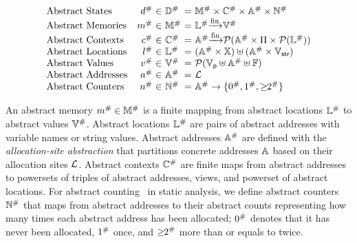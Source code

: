 \[
  \begin{array}{lr@{~}c@{~}l@{~}c@{~}l}
    \text{Abstract States} & \abselem &\in& \absdom &=& \absmemset \times \absctxtset
    \times \absaddrset \times \abscountset\\
    \text{Abstract Memories} & \absmem &\in& \absmemset &=& \abslocset \finmap
    \absvalset\\
    \text{Abstract Contexts} & \absctxt &\in& \absctxtset &=& \absaddrset \finmap
    \powerset{\absaddrset \times \viewset \times \powerset{\abslocset}}\\
    \text{Abstract Locations} & \absloc &\in& \abslocset &=& (\absaddrset \times
    \varset) \uplus (\absaddrset \times \strset)\\
    \text{Abstract Values} & \absval &\in& \absvalset &=& \powerset{\pvalset
    \uplus \absaddrset \uplus \fvalset}\\
    \text{Abstract Addresses} & \absaddr &\in& \absaddrset &=& \labset\\
    \text{Abstract Counters} & \abscount &\in& \abscountset &=& \absaddrset
    \rightarrow \{ \abszero, \absone, \absmany \}\\
  \end{array}
\]

An abstract memory ${m}^{\#} \in {\mathbb{M}}^{\#}$ is a finite mapping from abstract
locations ${\mathbb{L}}^{\#}$ to abstract values ${\mathbb{V}}^{\#}$.  Abstract locations
${\mathbb{L}}^{\#}$ are pairs of abstract addresses with variable names or string
values. Abstract addresses ${\mathbb{A}}^{\#}$ are defined with the
\textit{allocation-site abstraction} that partitions concrete addresses
$\mathbb{A}$ based on their allocation sites $\mathcal{L}$.  Abstract contexts
${\mathbb{C}}^{\#}$ are finite maps from abstract addresses to powersets of triples of
abstract addresses, views, and powerset of abstract locations.  For abstract
counting~\cite{abstract-gc-counting, revisit-recency} in static analysis, we
define abstract counters ${\mathbb{N}}^{\#}$ that maps from abstract addresses to
their abstract counts representing how many times each abstract address has been
allocated; ${0}^{\#}$ denotes that it has never been allocated, ${1}^{\#}$ once,
and ${\geq\!\!2}^{\#}$ more than or equals to twice.

